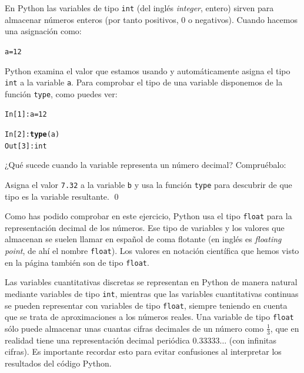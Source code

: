 \documentclass[10pt,a4paper]{article}\usepackage[]{graphicx}\usepackage[]{color}
\makeatletter
\newcommand{\hlnum}[1]{\textcolor[rgb]{0.686,0.059,0.569}{#1}}%
\newcommand{\hlopt}[1]{\textcolor[rgb]{0,0,0}{#1}}%
\newcommand{\hlstd}[1]{\textcolor[rgb]{0.345,0.345,0.345}{#1}}%
\newcommand{\hlkwb}[1]{\textcolor[rgb]{0.69,0.353,0.396}{#1}}%
\newcommand{\hlkwd}[1]{\textcolor[rgb]{0.737,0.353,0.396}{\textbf{#1}}}%
\newenvironment{kframe}{%
 \def\at@end@of@kframe{}%
 \ifinner\ifhmode%
  \def\at@end@of@kframe{\end{minipage}}%
  \begin{minipage}{\columnwidth}%
 \fi\fi%
 \def\FrameCommand##1{\hskip\@totalleftmargin \hskip-\fboxsep
 \colorbox{shadecolor}{##1}\hskip-\fboxsep
     \hskip-\linewidth \hskip-\@totalleftmargin \hskip\columnwidth}%
 \MakeFramed {\advance\hsize-\width
   \@totalleftmargin\z@ \linewidth\hsize
   \@setminipage}}%
 {\par\unskip\endMakeFramed%
 \at@end@of@kframe}
\newenvironment{knitrout}{}{} %
\newcounter {cont01}
\makeatother
\begin{document}
En Python las variables de tipo {\tt int} (del inglés {\em integer}, entero) sirven para almacenar números enteros (por tanto positivos, 0 o negativos). Cuando hacemos una asignación como:
\begin{knitrout}
\color{fgcolor}\begin{kframe}
\begin{alltt}
\hlstd{a} \hlkwb{=} \hlnum{12}
\end{alltt}
\end{kframe}
\end{knitrout}
Python examina el valor que estamos usando y automáticamente asigna el tipo {\tt int} a la variable {\tt a}. Para comprobar el tipo de una variable disponemos de la función {\tt type}, como puedes ver:
\begin{knitrout}
\color{fgcolor}\begin{kframe}
\begin{alltt}
\hlstd{In [}\hlnum{1}\hlstd{]}\hlopt{:} \hlstd{a} \hlkwb{=} \hlnum{12}

\hlstd{In [}\hlnum{2}\hlstd{]}\hlopt{:} \hlkwd{type}\hlstd{(a)}
\hlstd{Out[}\hlnum{3}\hlstd{]}\hlopt{:} \hlstd{int}
\end{alltt}
\end{kframe}
\end{knitrout}
¿Qué sucede cuando la variable representa un número decimal? Compruébalo:

\begin{ejercicio}
\label{tut02:ejercicio10}
Asigna el valor {\tt 7.32} a la variable {\tt b} y usa la función {\tt type} para descubrir de que tipo es la variable resultante.
\qed
\end{ejercicio}
Como has podido comprobar en este ejercicio, Python usa el tipo {\tt float} para la representación decimal de los números. Ese tipo de variables y los valores que almacenan se suelen llamar en español de {\sf coma flotante} (en inglés es {\em floating point}, de ahí el nombre {\tt float}). Los valores en notación científica que hemos visto en la página \pageref{tut02:subsubsec:notacionCientifica} también son de tipo {\tt float}.

Las variables cuantitativas discretas se representan en Python de manera natural mediante variables de tipo {\tt int}, mientras que las variables cuantitativas continuas se pueden representar con variables de tipo {\tt float}, siempre teniendo en cuenta que se trata de aproximaciones a los números reales. Una variable de tipo {\tt float} sólo puede almacenar unas cuantas cifras decimales de un número como  $\frac{1}{3}$, que en realidad tiene una representación decimal periódica $0.33333\ldots$ (con infinitas cifras). Es importante recordar esto para evitar confusiones al interpretar los resultados del código Python.
\end{document}
